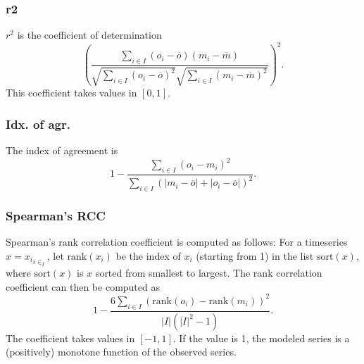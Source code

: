 \documentclass[11pt]{article}
\theoremstyle{definition}
\begin{document}
\subsubsection{r2}
$r^2$ is the coefficient of determination
\[
\left(\frac{\sum_{i\in I}(o_i-\overline{o})(m_i-\overline{m})}{\sqrt{\sum_{i\in I}(o_i-\overline{o})^2}\sqrt{\sum_{i\in I}(m_i-\overline{m})^2}}\right)^2.
\]
This coefficient takes values in $[0, 1]$.

\subsubsection{Idx. of agr.}
The index of agreement is
\[
1 - \frac{\sum_{i\in I}(o_i-m_i)^2}{\sum_{i\in I}(|m_i-\overline{o}| + |o_i-\overline{o}|)^2}.
\]

\subsubsection{Spearman's RCC}
Spearman's rank correlation coefficient \cite{spearman04} is computed as follows: For a timeseries $x={x_i}_{i\in_I}$, let $\mathrm{rank}(x_i)$ be the index of $x_i$ (starting from 1) in the list $\mathrm{sort}(x)$, where $\mathrm{sort}(x)$ is $x$ sorted from smallest to largest. The rank correlation coefficient can then be computed as
\[
1 - \frac{6\sum_{i\in I}(\mathrm{rank}(o_i)-\mathrm{rank}(m_i))^2}{|I|(|I|^2 - 1)}.
\]
The coefficient takes values in $[-1, 1]$. If the value is 1, the modeled series is a (positively) monotone function of the observed series.




\end{document}
